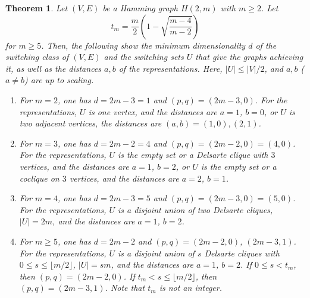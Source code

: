 \documentclass[a4paper, 11pt]{article}
\newtheorem{theorem}{Theorem}[section]
\theoremstyle{definition}
\begin{document}
\begin{theorem} \label{thm:Hamming}
Let $(V,E)$ be a Hamming graph $H(2,m)$ with $m\geq 2$.  
Let 
\[
t_m=\frac{m}{2}\left(1-\sqrt{\frac{m-4}{m-2}}\right)
\]
for $m\geq 5$. 
Then, the following show the minimum dimensionality $d$ of the switching class of $(V,E)$ and the switching sets $U$ that give the graphs achieving it, as well as the distances $a,b$ of the representations. 
Here, $|U| \leq |V|/2$, and $a,b$ ($a\ne b$) are up to scaling. 
\begin{enumerate}
\item For $m=2$, one has $d=2m-3=1$ and $(p,q)=(2m-3,0)$. 
For the representations, $U$ is one vertex, and 
the distances are $a=1$, $b=0$, or $U$ is two adjacent vertices, the distances are $(a,b)=(1,0),(2,1)$. 
\item For $m=3$, one has $d=2m-2=4$ and $(p,q)=(2m-2,0)=(4,0)$. 
For  the representations, $U$ is the empty set or a Delsarte clique with $3$ vertices, and the distances are $a=1$, $b=2$,  
or $U$ is the empty set or a coclique on $3$ vertices, and the distances are $a=2$, $b=1$. 
\item For $m=4$, one has $d=2m-3=5$ and $(p,q)=(2m-3,0)=(5,0)$. 
For the representations, $U$ is a disjoint union of two Delsarte cliques, $|U|=2m$, and the distances are $a=1$, $b=2$. 
\item For $m\geq 5$, one has $d=2m-2$ and $(p,q)=(2m-2,0)$, $(2m-3,1)$.  
For the representations, $U$ is a disjoint union of $s$ Delsarte cliques with $0 \leq s\leq \lfloor m/2 \rfloor$, $|U|=sm$, and the distances are $a=1$, $b=2$. 
If $0\leq s<t_m$, then $(p,q)=(2m-2,0)$.   
If $t_m <s \leq  \lfloor m/2 \rfloor$, then $(p,q)=(2m-3,1)$. Note that $t_m$ is not an integer. 
\end{enumerate} 
\end{theorem}
\end{document}
